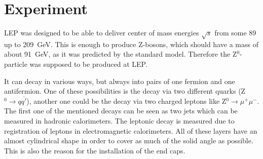 \documentclass[epj,nopacs]{svjour}
\begin{document}
\section{ Experiment}

LEP was designed to be able to deliver center of mass energies $\sqrt{s}$ from
some 89 up to \SI{209}{\giga\electronvolt}. This is enough to produce Z-bosons,
which should have a mass of about \SI{91}{\giga\electronvolt}, as it was
predicted by the standard model. Therefore the Z$^0$-particle was supposed to be
produced at LEP.

It can decay in various ways, but always into pairs of one
fermion and one antifermion. One of these possibilities is the decay via two
different quarks (Z$^0→q\overline{q'}$), another one could be the decay via two
charged leptons like Z$^0→ μ^+μ^-$. The first one of the mentioned decays can be
seen as two jets which can be measured in hadronic calorimeters. The leptonic
decay is measured due to registration of leptons in electromagnetic
calorimeters. All of these layers have an almost cylindrical shape in order to
cover as much of the solid angle as possible. This is also the reason for the
installation of the end caps.
\end{document}
